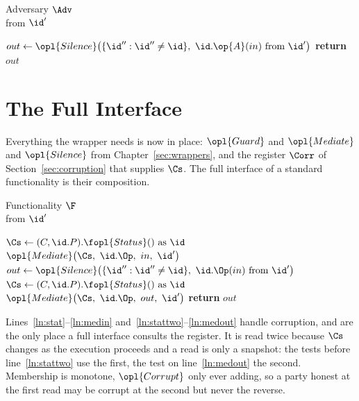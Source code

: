 \documentclass[10pt,oneside,openany]{book}
\theoremstyle{accentdef}
\theoremstyle{accentplain}
\begin{document}
\begin{interface}{Adversary $\Adv$ \\
}
 \quad from $\id'$
\begin{algorithmic}[1]
  \State $out \gets \opl{Silence}\bigl(\{\id'' : \id'' \ne \id \} ,\ \id.\op{A}(in) \text{ from } \id' \bigr)$
    \label{ln:advsil}
  \State \textbf{return} $out$
\end{algorithmic}
\end{interface}

\section{The Full Interface}\label{sec:fullinterface}

Everything the wrapper needs is now in place: $\opl{Guard}$ and $\opl{Mediate}$ and
$\opl{Silence}$ from Chapter~\ref{sec:wrappers}, and the register $\Corr$ of
Section~\ref{sec:corruption} that supplies $\Cs$. The full interface of a standard
functionality is their composition.

\begin{interface}{Functionality $\F$ \\
\params{$\PID$, \quad $\Ps$, \quad $\admits$, \quad $\uses$, \quad $\pars$}}
 \quad from $\id'$
\begin{algorithmic}[1]
 \label{ln:guard}
\State $\Cs \gets (C,\id.P).\fopl{Status}() \text{ as } \id$ \label{ln:stat}
  \label{ln:corrgate}
\State $\opl{Mediate}\bigl(\Cs,\ \id.\Op,\ in,\ \id'\bigr)$ \label{ln:medin}
\State $out \gets \opl{Silence}\bigl(\{\id'' : \id'' \ne \id \} ,\ \id.\Op(in) \text{ from } \id' \bigr)$ \label{ln:call}
\State $\Cs \gets (C,\id.P).\fopl{Status}() \text{ as } \id$ \label{ln:stattwo}
\State $\opl{Mediate}\bigl(\Cs,\ \id.\Op,\ out,\ \id'\bigr)$ \label{ln:medout}
\State \textbf{return} $out$ \label{ln:ret}
\end{algorithmic}
\end{interface}

Lines~\ref{ln:stat}--\ref{ln:medin} and~\ref{ln:stattwo}--\ref{ln:medout} handle corruption, and
are the only place a full interface consults the register. It is read twice because $\Cs$ changes
as the execution proceeds and a read is only a snapshot: the tests before line~\ref{ln:stattwo}
use the first, the test on line~\ref{ln:medout} the second. Membership is monotone, $\opl{Corrupt}$ only ever adding, so a
party honest at the first read may be corrupt at the second but never the reverse.
\end{document}
